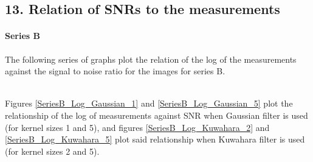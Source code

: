 \documentclass[runningheads]{llncs}
\begin{document}
\subsection*{13. Relation of SNRs to the measurements}

\paragraph*{\textbf{Series B}}
The following series of graphs plot the relation of the log of the measurements against the signal to noise ratio for the images for series B. 

~\\Figures \ref{SeriesB_Log_Gaussian_1} and \ref{SeriesB_Log_Gaussian_5} plot the relationship of the log of measurements against SNR when Gaussian filter is used (for kernel sizes 1 and 5), and figures \ref{SeriesB_Log_Kuwahara_2} and \ref{SeriesB_Log_Kuwahara_5} plot said relationship when Kuwahara filter is used (for kernel sizes 2 and 5).
\end{document}
